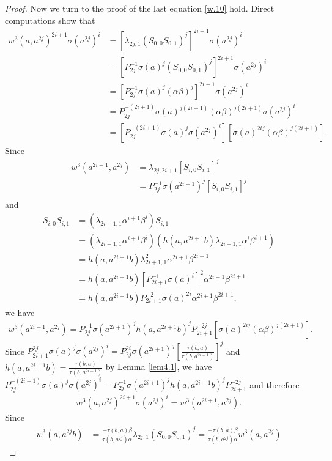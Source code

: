 \documentclass[a4paper,11pt]{amsart}
\numberwithin{equation}{section}
\begin{document}
\begin{proof}
Now we turn to the proof of the last equation \eqref{w.10} hold. Direct computations show that
\begin{align*}
w^3(a,a^{2j})^{2i+1} \sigma(a^{2j})^i&=[\lambda_{2j,1} (S_{0,0} S_{0,1})^j]^{2i+1} \sigma(a^{2j})^i\\
&=[P_{2j}^{-1} \sigma(a)^j (S_{0,0} S_{0,1})^j]^{2i+1} \sigma(a^{2j})^i\\
&=[P_{2j}^{-1} \sigma(a)^j (\alpha \beta)^j]^{2i+1} \sigma(a^{2j})^i\\
&=P_{2j}^{-(2i+1)} \sigma(a)^{j(2i+1)} (\alpha \beta)^{j(2i+1)} \sigma(a^{2j})^i\\
&=[P_{2j}^{-(2i+1)} \sigma(a)^{j} \sigma(a^{2j})^i] [\sigma(a)^{2ij}(\alpha \beta)^{j(2i+1)}].
\end{align*}
Since
\begin{align*}
w^3(a^{2i+1},a^{2j})&=\lambda_{2j,2i+1}[S_{i,0}S_{i,1}]^j\\
&=P_{2j}^{-1} \sigma(a^{2i+1})^j [S_{i,0}S_{i,1}]^j\\
\end{align*}
and
\begin{align*}
S_{i,0}S_{i,1}&=(\lambda_{2i+1,1} \alpha^{i+1} \beta^{i}) S_{i,1}\\
&=(\lambda_{2i+1,1} \alpha^{i+1} \beta^{i}) (h(a,a^{2i+1}b) \lambda_{2i+1,1} \alpha^{i} \beta^{i+1})\\
&=h(a,a^{2i+1}b) \lambda_{2i+1,1}^2 \alpha^{2i+1} \beta^{2i+1}\\
&=h(a,a^{2i+1}b) [P_{2i+1}^{-1} \sigma(a)^i]^2 \alpha^{2i+1} \beta^{2i+1}\\
&=h(a,a^{2i+1}b) P_{2i+1}^{-2} \sigma(a)^{2i} \alpha^{2i+1} \beta^{2i+1},
\end{align*}
we have
\begin{align*}
w^3(a^{2i+1},a^{2j})=P_{2j}^{-1} \sigma(a^{2i+1})^j h(a,a^{2i+1}b)^j P_{2i+1}^{-2j} [\sigma(a)^{2ij}(\alpha \beta)^{j(2i+1)}].
\end{align*}
Since $P_{2i+1}^{2j}\sigma(a)^j\sigma(a^{2j})^i=P_{2j}^{2i}\sigma(a^{2i+1})^j
[\frac{\tau(b,a)}{\tau(b,a^{2i+1})}]^j$  and $h(a,a^{2i+1}b)=\frac{\tau(b,a)}{\tau(b,a^{2i+1})}$ by Lemma \ref{lem4.1}, we have $P_{2j}^{-(2i+1)} \sigma(a)^{j} \sigma(a^{2j})^i=P_{2j}^{-1} \sigma(a^{2i+1})^j h(a,a^{2i+1}b)^j P_{2i+1}^{-2j}$ and therefore
\begin{align}
\label{light10} w^3(a,a^{2j})^{2i+1} \sigma(a^{2j})^i=w^3(a^{2i+1},a^{2j}).
\end{align}
Since
\begin{align*}
w^3(a,a^{2j}b)&=\frac{-\tau(b,a)\beta}{\tau(b,a^{2j}) \alpha} \lambda_{2j,1} (S_{0,0} S_{0,1})^j=\frac{-\tau(b,a)\beta}{\tau(b,a^{2j})\alpha} w^3(a,a^{2j})

\end{align*}
\end{proof}
\end{document}
